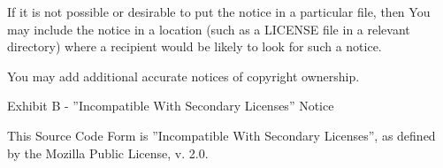 If it is not possible or desirable to put the notice in a particular file, then You may include the notice in a location (such as a LICENSE file in a relevant directory) where a recipient would be likely to look for such a notice.

You may add additional accurate notices of copyright ownership.

\vparasmall
Exhibit B - ''Incompatible With Secondary Licenses'' Notice

This Source Code Form is ''Incompatible With Secondary Licenses'', as defined by the Mozilla Public License, v. 2.0.







%
%
%
%
%
%
%
%
%
%
%
%
%
%
%
%

